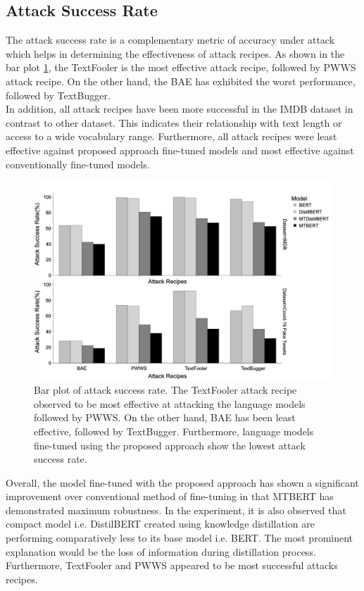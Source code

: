 \documentclass[%
	BCOR=8mm, %
	DIV=12,
	toc=bibliography, %
	toc=listof, %
	oneside, %
	egregdoesnotlikesansseriftitles, %
	]{scrbook}
\begin{document}
\subsection{Attack Success Rate}
\label{subsection:attacksuccessrate}
The attack success rate is a complementary metric of accuracy under attack which helps in determining the effectiveness of  attack recipes.
As shown in the bar plot \ref{fig:attacksuccessrate}, the TextFooler  is the most effective attack recipe, followed by PWWS  attack recipe. On the other hand, the BAE  has exhibited the worst performance, followed by TextBugger. \\
In addition, all attack recipes have been more successful in the IMDB dataset in contrast to other dataset. This indicates their relationship with text length or access to a wide vocabulary range. Furthermore, all attack recipes were least effective against proposed approach fine-tuned models and most effective against conventionally fine-tuned models.
\begin{figure}[H]
    \centering
    \includegraphics[width=.9\linewidth]{img/attack_success_rate.png}
    \caption[Bar plot of attack success rate]{Bar plot of attack success rate. The TextFooler attack recipe observed to be most effective at attacking the language models followed by PWWS. On the other hand, BAE has been least effective, followed by TextBugger. Furthermore, language models fine-tuned using the proposed approach show the lowest attack success rate. }
    \label{fig:attacksuccessrate}
\end{figure}
Overall, the model fine-tuned with the proposed approach has shown a significant improvement over conventional method of fine-tuning in that MTBERT has demonstrated maximum robustness. In the experiment, it is also observed that compact model i.e. DistilBERT created using knowledge distillation are performing comparatively less to its base model i.e. BERT. The most prominent explanation would be the loss of information during distillation process. Furthermore, TextFooler and PWWS  appeared to be most successful attacks recipes. 
\end{document}

